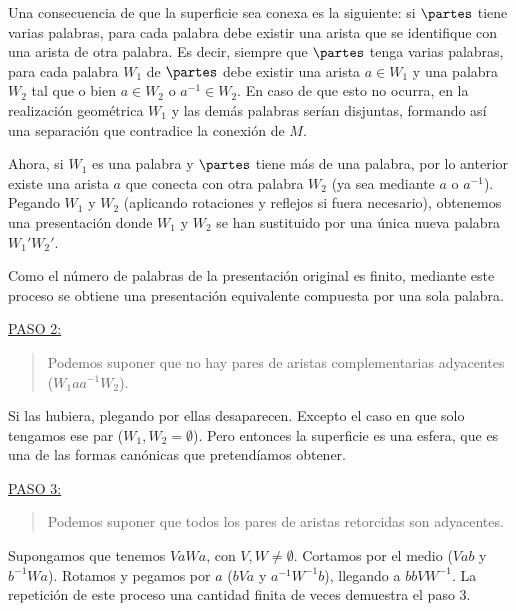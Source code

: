 {    \noindent
    Una consecuencia de que la superficie sea conexa es la siguiente: si $\partes$ tiene varias palabras, para cada palabra debe existir una arista que se identifique con una arista de otra palabra. 
    Es decir, siempre que $\partes$ tenga varias palabras, para cada palabra $W_1$ de $\partes$ debe existir una arista $a \in W_1$ y una palabra $W_2$ tal que 
    o bien $a\in W_2$ o $a^{-1}\in W_2$. En caso de que esto no ocurra, en la realización geométrica $W_1$ y las demás palabras serían disjuntas, formando así una separación que
    contradice la conexión de $M$.

    \vspace{0.5em}
    \noindent
    Ahora, si $W_1$ es una palabra y $\partes$ tiene más de una palabra, por lo anterior existe una arista $a$ que conecta con otra palabra $W_2$ 
    (ya sea mediante $a$ o $a^{-1}$). Pegando $W_1$ y $W_2$ (aplicando rotaciones y reflejos si fuera necesario), 
    obtenemos una presentación donde $W_1$ y $W_2$ se han sustituido por una única nueva palabra $W_1'W_2'$. 

    \vspace{0.5em}
    \noindent
    Como el número de palabras de la presentación original es finito, mediante este proceso se obtiene una presentación equivalente compuesta por una sola palabra.

    \vspace{1.3em}
    \noindent
    \underline{PASO 2:}
    \begin{quote}
        Podemos suponer que no hay pares de aristas complementarias adyacentes ($W_1aa^{-1}W_2$).
    \end{quote}

    \noindent
    Si las hubiera, plegando por ellas desaparecen. Excepto el caso en que solo tengamos ese par ($W_1, W_2 = \emptyset$). 
    Pero entonces la superficie es una esfera, que es una de las formas canónicas que pretendíamos obtener.

    \vspace{1.3em}
    \noindent
    \underline{PASO 3:}
    \begin{quote}
        Podemos suponer que todos los pares de aristas retorcidas son adyacentes.
    \end{quote}

    \noindent
    Supongamos que tenemos $VaWa$, con $V,W \ne \emptyset$. Cortamos por el medio ($Vab$ y $b^{-1}Wa$). 
    Rotamos y pegamos por $a$ ($bVa$ y $a^{-1}W^{-1}b$), llegando a $bbVW^{-1}$. 
    La repetición de este proceso una cantidad finita de veces demuestra el paso 3.

}
